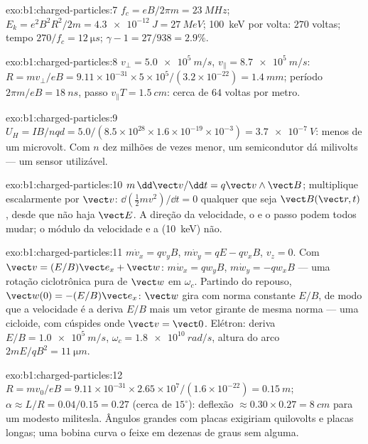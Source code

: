 \begin{solution}{exo:b1:charged-particles:7}
$f_c = eB/2\pi m = \qty{23}{MHz}$; $E_k = e^2B^2R^2/2m = \qty{4.3e-12}{J} =
\qty{27}{MeV}$; \qty{100}{keV} por volta: $270$ voltas; tempo $270/f_c =
\qty{12}{\micro s}$; $\gamma - 1 = 27/938 = 2.9\%$.
\end{solution}

\begin{solution}{exo:b1:charged-particles:8}
$v_\perp = \qty{5.0e5}{m/s}$, $v_\parallel = \qty{8.7e5}{m/s}$: $R = mv_\perp/eB
= 9.11\times10^{-31} \times 5\times10^5/(3.2\times10^{-22}) = \qty{1.4}{mm}$;
período $2\pi m/eB = \qty{18}{ns}$, passo $v_\parallel T = \qty{1.5}{cm}$:
cerca de $64$ voltas por metro.
\end{solution}

\begin{solution}{exo:b1:charged-particles:9}
$U_H = IB/nqd = 5.0/(8.5\times10^{28} \times 1.6\times10^{-19} \times 10^{-3})
= \qty{3.7e-7}{V}$: menos de um microvolt. Com $n$ dez milhões de vezes menor, um
semicondutor dá milivolts --- um sensor utilizável.
\end{solution}

\begin{solution}{exo:b1:charged-particles:10}
$m\,\dd\vect v/\dd t = q\vect v\wedge\vect B$; multiplique escalarmente por $\vect v$: $\dd(\tfrac12 mv^2)/
\dd t = 0$ qualquer que seja $\vect B(\vect r, t)$, desde que não haja $\vect E$. A
direção da velocidade, o  e o passo podem todos
mudar; o módulo da velocidade e a  (\qty{10}{keV}) não.
\end{solution}

\begin{solution}{exo:b1:charged-particles:11}
$m\dot v_x = qv_yB$, $m\dot v_y = qE - qv_xB$, $v_z = 0$. Com $\vect v =
(E/B)\vect e_x + \vect w$: $m\dot w_x = qw_yB$, $m\dot w_y = -qw_xB$ --- uma
rotação ciclotrônica pura de $\vect w$ em $\omega_c$. Partindo do repouso,
$\vect w(0) = -(E/B)\vect e_x$: $\vect w$ gira com norma constante $E/B$, de modo que a
velocidade é a deriva $E/B$ mais um vetor girante de mesma norma ---
uma cicloide, com cúspides onde $\vect v = \vect 0$. Elétron: deriva $E/B =
\qty{1.0e5}{m/s}$, $\omega_c = \qty{1.8e10}{rad/s}$, altura do arco $2mE/qB^2 =
\qty{11}{\micro m}$.
\end{solution}

\begin{solution}{exo:b1:charged-particles:12}
$R = mv_0/eB = 9.11\times10^{-31} \times 2.65\times10^7/(1.6\times10^{-22}) =
\qty{0.15}{m}$; $\alpha \approx L/R = 0.04/0.15 = 0.27$ (cerca de $15^\circ$):
deflexão $\approx 0.30 \times 0.27 = \qty{8}{cm}$ para um modesto
militesla. Ângulos grandes com placas exigiriam quilovolts e placas
longas; uma bobina curva o feixe em dezenas de graus sem 
alguma.
\end{solution}

